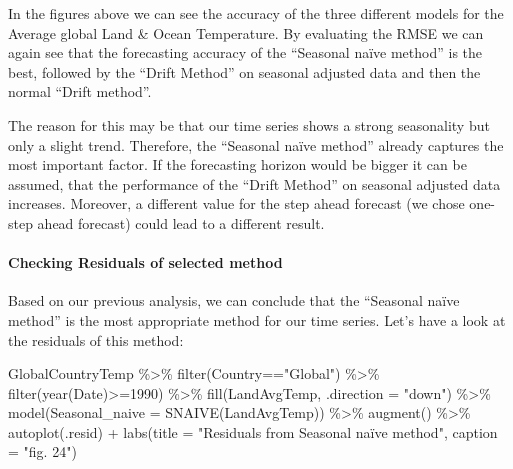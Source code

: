 \documentclass[
]{article}
\newenvironment{Shaded}{\begin{snugshade}}{\end{snugshade}}
\newcommand{\AttributeTok}[1]{\textcolor[rgb]{0.77,0.63,0.00}{#1}}
\newcommand{\DecValTok}[1]{\textcolor[rgb]{0.00,0.00,0.81}{#1}}
\newcommand{\FunctionTok}[1]{\textcolor[rgb]{0.00,0.00,0.00}{#1}}
\newcommand{\NormalTok}[1]{#1}
\newcommand{\SpecialCharTok}[1]{\textcolor[rgb]{0.00,0.00,0.00}{#1}}
\newcommand{\StringTok}[1]{\textcolor[rgb]{0.31,0.60,0.02}{#1}}
\begin{document}
In the figures above we can see the accuracy of the three different
models for the Average global Land \& Ocean Temperature. By evaluating
the RMSE we can again see that the forecasting accuracy of the
``Seasonal naïve method'' is the best, followed by the ``Drift Method''
on seasonal adjusted data and then the normal ``Drift method''.

The reason for this may be that our time series shows a strong
seasonality but only a slight trend. Therefore, the ``Seasonal naïve
method'' already captures the most important factor. If the forecasting
horizon would be bigger it can be assumed, that the performance of the
``Drift Method'' on seasonal adjusted data increases. Moreover, a
different value for the step ahead forecast (we chose one-step ahead
forecast) could lead to a different result.

\hypertarget{checking-residuals-of-selected-method}{%
\paragraph{Checking Residuals of selected
method}\label{checking-residuals-of-selected-method}}

Based on our previous analysis, we can conclude that the ``Seasonal
naïve method'' is the most appropriate method for our time series. Let's
have a look at the residuals of this method:

\begin{Shaded}
\begin{Highlighting}[]
\NormalTok{GlobalCountryTemp }\SpecialCharTok{\%\textgreater{}\%} 
  \FunctionTok{filter}\NormalTok{(Country}\SpecialCharTok{==}\StringTok{"Global"}\NormalTok{) }\SpecialCharTok{\%\textgreater{}\%} 
  \FunctionTok{filter}\NormalTok{(}\FunctionTok{year}\NormalTok{(Date)}\SpecialCharTok{\textgreater{}=}\DecValTok{1990}\NormalTok{) }\SpecialCharTok{\%\textgreater{}\%}
  \FunctionTok{fill}\NormalTok{(LandAvgTemp, }\AttributeTok{.direction =} \StringTok{"down"}\NormalTok{) }\SpecialCharTok{\%\textgreater{}\%} 
  \FunctionTok{model}\NormalTok{(}\AttributeTok{Seasonal\_naive =} \FunctionTok{SNAIVE}\NormalTok{(LandAvgTemp)) }\SpecialCharTok{\%\textgreater{}\%} 
  \FunctionTok{augment}\NormalTok{() }\SpecialCharTok{\%\textgreater{}\%} 
  \FunctionTok{autoplot}\NormalTok{(.resid) }\SpecialCharTok{+} \FunctionTok{labs}\NormalTok{(}\AttributeTok{title =} \StringTok{"Residuals from Seasonal naïve method"}\NormalTok{, }\AttributeTok{caption =} \StringTok{"fig. 24"}\NormalTok{)}
\end{Highlighting}
\end{Shaded}
\end{document}
